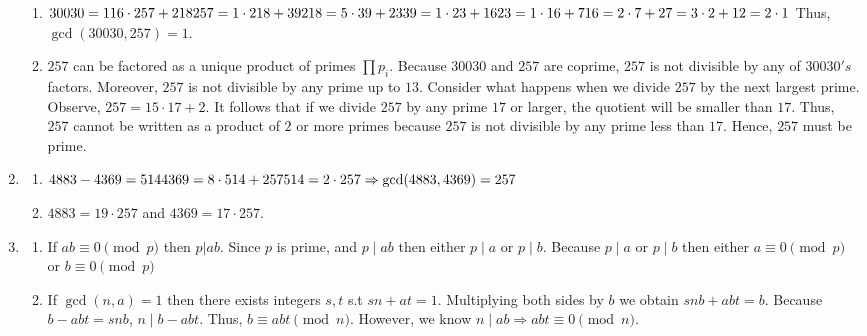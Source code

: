 \documentclass[10pt]{article}
\begin{document}
\begin{enumerate}[label= \arabic*.]
\begin{enumerate}
        \item $30030=116\cdot 257+218\\
        257=1\cdot 218+39\\
        218=5\cdot 39+23\\
        39=1\cdot 23+16\\
        23=1\cdot 16+7\\
        16=2\cdot 7+2\\
        7=3\cdot 2+1\\
        2=2\cdot 1\\$
        Thus, $\gcd(30030,257)=1$.
        \item $257$ can be factored as a unique product of primes $\prod p_i$. 
        Because $30030$ and $257$ are coprime, $257$ is not divisible by any of $30030's$ factors.
        Moreover, $257$ is not divisible by any prime up to $13$.
        Consider what happens when we divide $257$ by the next largest prime.
        Observe, $257=15\cdot 17+2$.
        It follows that if we divide $257$ by any prime $17$ or larger, the quotient will be smaller than $17$. 
        Thus, $257$ cannot be written as a product of $2$ or more primes because $257$ is not divisible by any prime less than $17$.
        Hence, $257$ must be prime.
    \end{enumerate}
    \item \begin{enumerate}
        \item $4883-4369=514\\
        4369=8\cdot 514+257\\
        514=2\cdot 257\\
        \Rightarrow \gcd(4883,4369)=257$
    \item $4883=19\cdot 257$ and $4369=17\cdot 257$.
    \end{enumerate}
    \item \begin{enumerate}
        \item If $ab\equiv 0\pmod{p}$ then $p|ab$. 
        Since $p$ is prime, and $p\mid ab$ then either $p\mid a$ or $p\mid b$. 
        Because $p\mid a$ or $p\mid b$ then either $a\equiv 0\pmod{p}$ or $b\equiv 0\pmod{p}$
        \item If $\gcd(n,a)=1$ then there exists integers $s,t$ s.t $sn+at=1$.
        Multiplying both sides by $b$ we obtain $snb+abt=b$.  
        Because $b-abt=snb$, $n\mid b-abt$.
        Thus, $b\equiv abt\pmod{n}$.
        However, we know $n\mid ab\Rightarrow abt\equiv 0\pmod{n}$.

\end{enumerate}
\end{enumerate}
\end{document}
